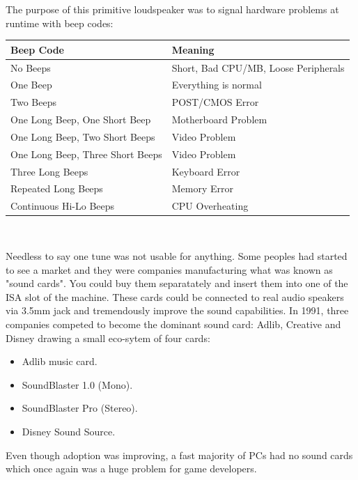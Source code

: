 \documentclass[book.tex]{subfiles}
\begin{document}
\par
 The purpose of this primitive loudspeaker was to signal hardware problems at runtime with beep codes:\\
\par
\begin{tabularx}{\textwidth}{l l}
\textbf{Beep Code} & \textbf{Meaning}  \\ \hline
No Beeps                         & Short, Bad CPU/MB, Loose Peripherals \\ \hline
One Beep                         & Everything is normal\\ \hline
Two Beeps                        & POST/CMOS Error \\ \hline 
One Long Beep, One Short Beep    & Motherboard Problem \\ \hline
One Long Beep, Two Short Beeps   & Video Problem \\ \hline
One Long Beep, Three Short Beeps & Video Problem \\ \hline
Three Long Beeps                 & Keyboard Error \\ \hline
Repeated Long Beeps              & Memory Error \\ \hline
Continuous Hi-Lo Beeps           & CPU Overheating \\ \hline
\end{tabularx}\\
\bigskip
\par
Needless to say one tune was not usable for anything. Some peoples had started to see a market and they were companies manufacturing what was known as "sound cards". You could buy them separatately and insert them into one of the ISA slot of the machine. These cards could be connected to real audio speakers via 3.5mm jack and tremendously improve the sound capabilities. In 1991, three companies competed to become the dominant sound card: Adlib, Creative and Disney drawing a small eco-sytem of four cards:\\
\par
\begin{itemize}
\item Adlib music card.
\item SoundBlaster 1.0 (Mono).
\item SoundBlaster Pro (Stereo).
\item Disney Sound Source.
\end{itemize}
\par
Even though adoption was improving, a fast majority of PCs had no sound cards which once again was a huge problem for game developers.
\end{document}
